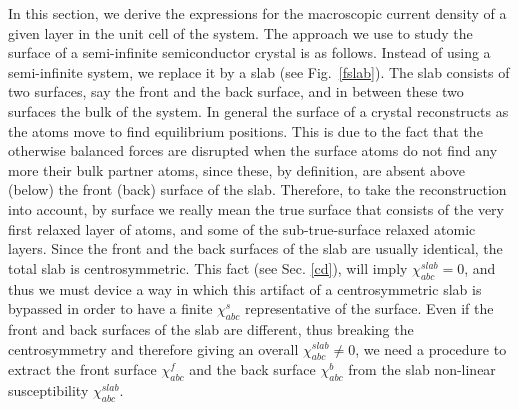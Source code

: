 \documentclass{article}
\begin{document}
In this section, we derive the expressions for the macroscopic current
density of a given layer in the unit cell of the system.
The approach we use to study the surface of a semi-infinite
semiconductor crystal is as follows. Instead of using a
semi-infinite system, we replace it by a slab (see Fig.~\ref{fslab}).
The slab consists of
two surfaces, say the front and the back surface, and in between these
two surfaces the bulk of the system. 
In
general the surface of a crystal reconstructs as the atoms
move to find equilibrium positions. This is due to the fact that
the otherwise
balanced forces are disrupted when the surface atoms do not find any
more their bulk partner atoms, since these, by definition, are absent
above (below) the front (back) surface of the slab. 
Therefore, to take the reconstruction into account, by surface we really mean
the true surface that consists of the very first relaxed layer of atoms, and
some of the sub-true-surface relaxed atomic layers.
Since the front and the back
surfaces of the slab are usually identical, the total slab is
centrosymmetric. This fact (see Sec. \ref{cd}), will imply $\chi^{slab}_{abc}=0$, and thus we must
device a way in which this artifact of a centrosymmetric slab is
bypassed in order to have a finite $\chi^s_{abc}$ representative of the
surface. Even if the front and back surfaces of the slab 
are different, thus breaking the centrosymmetry and therefore giving an
overall $\chi^{slab}_{abc}\ne 0$, we
need a procedure to extract the front surface $\chi^f_{abc}$
and
the back surface $\chi^b_{abc}$ from the slab non-linear
susceptibility $\chi^{slab}_{abc}$.
\end{document}
